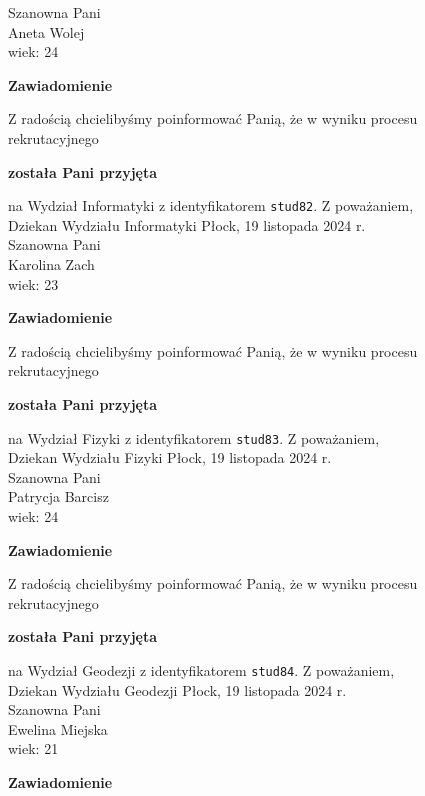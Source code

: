 \documentclass[12pt,a4paper]{article}
\begin{document}
Szanowna Pani \\
Aneta Wolej \\
wiek: 24
\bigskip
\begin{center}
    {\Large\textbf{Zawiadomienie}}
\end{center}
\bigskip 
Z radością chcielibyśmy poinformować Panią, że w wyniku procesu rekrutacyjnego
\begin{center}
\textsf{\textbf{została Pani przyjęta}}
\end{center}
na Wydział Informatyki z identyfikatorem \verb|stud82|. 
\vspace{2cm}
\noindent
Z poważaniem, \\
Dziekan
Wydziału Informatyki
\newpage
\hfill Płock, 19 listopada 2024 r. \\
\noindent
Szanowna Pani \\
Karolina Zach \\
wiek: 23
\bigskip
\begin{center}
    {\Large\textbf{Zawiadomienie}}
\end{center}
\bigskip 
Z radością chcielibyśmy poinformować Panią, że w wyniku procesu rekrutacyjnego
\begin{center}
\textsf{\textbf{została Pani przyjęta}}
\end{center}
na Wydział Fizyki z identyfikatorem \verb|stud83|. 
\vspace{2cm}
\noindent
Z poważaniem, \\
Dziekan
Wydziału Fizyki
\newpage
\hfill Płock, 19 listopada 2024 r. \\
\noindent
Szanowna Pani \\
Patrycja Barcisz \\
wiek: 24
\bigskip
\begin{center}
    {\Large\textbf{Zawiadomienie}}
\end{center}
\bigskip 
Z radością chcielibyśmy poinformować Panią, że w wyniku procesu rekrutacyjnego
\begin{center}
\textsf{\textbf{została Pani przyjęta}}
\end{center}
na Wydział Geodezji z identyfikatorem \verb|stud84|. 
\vspace{2cm}
\noindent
Z poważaniem, \\
Dziekan
Wydziału Geodezji
\newpage
\hfill Płock, 19 listopada 2024 r. \\
\noindent
Szanowna Pani \\
Ewelina Miejska \\
wiek: 21
\bigskip
\begin{center}
    {\Large\textbf{Zawiadomienie}}
\end{center}
\end{document}

